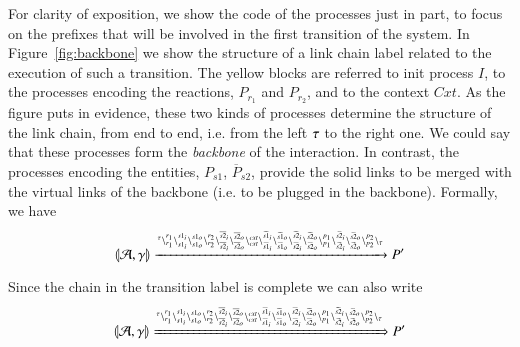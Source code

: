 \begin{example}
For clarity of exposition, we show the code of the processes just in part, to focus on the prefixes that will be involved in the first transition of the system. In Figure~\ref{fig:backbone} we show the  structure of a link chain label related to the execution of such a transition. The yellow blocks are referred to init process $I$, to the processes encoding the reactions, $P_{r_1}$ and $P_{r_2}$, and to the context $\mathit{Cxt}$. As the figure puts in evidence, these two kinds of processes determine the structure of the link chain, from end to end, i.e. from the left $\tau$ to the right one. We could say that these processes form the \emph{backbone} of the interaction.
   In contrast, the processes encoding the entities, $P_{s1}$,  $\overline{P}_{s2}$, provide the
    solid links to be merged with the virtual links of the backbone (i.e. to be plugged in the backbone).
 Formally, we have
 $$
 \llparenthesis{\cal A},\gamma\rrparenthesis \xrightarrow{
 {}^{\tau}
 \backslash_{r_1}^{r_1}
 \backslash_{s1_i}^{s1_i}
 \backslash_{s1_o}^{s1_o}
 \backslash_{r_2}^{r_2}
 \backslash_{\overline{s2}_i}^{\overline{s2}_i}
 \backslash_{\overline{s2}_o}^{\overline{s2}_o}
 \backslash_{\mathit{cxt}}^{\mathit{cxt}}
 \backslash_{\widehat{s1}_i}^{\widehat{s1}_i}
 \backslash_{\widehat{s1}_o}^{\widehat{s1}_o}
  \backslash_{\widehat{s2}_i}^{\widehat{s2}_i}
  \backslash_{\widehat{s2}_o}^{\widehat{s2}_o}
  \backslash_{p_1}^{p_1}
  \backslash_{\widetilde{s2}_i}^{\widetilde{s2}_i}
  \backslash_{\widetilde{s2}_o}^{\widetilde{s2}_o}
  \backslash_{p_2}^{p_2}
  \backslash_{\tau}
 }
 P'
 $$
 
 Since the chain in the transition label is complete we can also write
  $$
 \llparenthesis{\cal A},\gamma\rrparenthesis \xRightarrow{
 \ensuremath{{}^{\tau}}
 \ensuremath{\backslash_{r_1}^{r_1}}
 \ensuremath{\backslash_{s1_i}^{s1_i}}
 \ensuremath{\backslash_{s1_o}^{s1_o}}
 \ensuremath{\backslash_{r_2}^{r_2}}
 \ensuremath{\backslash_{\overline{s2}_i}^{\overline{s2}_i}}
 \ensuremath{\backslash_{\overline{s2}_o}^{\overline{s2}_o}}
 \ensuremath{\backslash_{\mathit{cxt}}^{\mathit{cxt}}}
 \ensuremath{\backslash_{\widehat{s1}_i}^{\widehat{s1}_i}}
 \ensuremath{\backslash_{\widehat{s1}_o}^{\widehat{s1}_o}}
  \ensuremath{\backslash_{\widehat{s2}_i}^{\widehat{s2}_i}}
  \ensuremath{\backslash_{\widehat{s2}_o}^{\widehat{s2}_o}}
  \ensuremath{\backslash_{p_1}^{p_1}}
  \ensuremath{\backslash_{\widetilde{s2}_i}^{\widetilde{s2}_i}}
  \ensuremath{\backslash_{\widetilde{s2}_o}^{\widetilde{s2}_o}}
  \ensuremath{\backslash_{p_2}^{p_2}}
  \ensuremath{\backslash_{\tau}}
 }
 P'
 $$

 
  \begin{figure}[t]
\end{figure}
\end{example}
